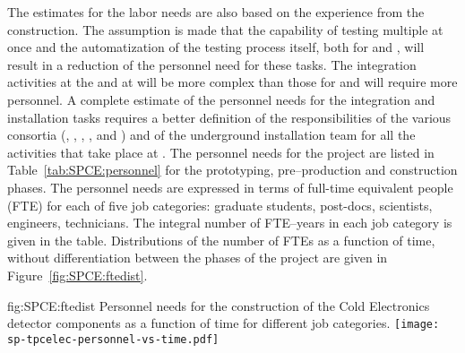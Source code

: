 The estimates for the labor needs are also based on the
experience from the  construction. The assumption
is made that the capability of testing multiple 
at once and the automatization of the testing process itself,
both for  and , will result in
a reduction of the personnel need for these tasks. The
integration activities at the  and at \surf
will be more complex than those for  and
will require more personnel. A complete estimate of the
personnel needs for the integration and installation tasks
requires a better definition of the responsibilities of
the various consortia (, , ,
, and ) and of the underground
installation team for all the activities that take place
at \surf. The personnel needs for the project are listed in
Table~\ref{tab:SPCE:personnel} for the prototyping,
pre--production and construction phases. The personnel
needs are expressed in terms of full-time equivalent
people (FTE) for each of five job categories: graduate students,
post-docs, scientists, engineers, technicians. The
integral number of FTE--years in each job category is given
in the table. Distributions of the number of FTEs as
a function of time, without differentiation between the
phases of the project are given in Figure~\ref{fig:SPCE:ftedist}.

\begin{dunefigure}
{fig:SPCE:ftedist}
{Personnel needs for the construction of the Cold Electronics detector components 
as a function of time for different job categories.}
\texttt{[image: sp-tpcelec-personnel-vs-time.pdf]}
\end{dunefigure}

